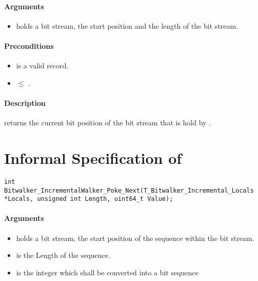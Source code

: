 \paragraph{Arguments}

\begin{itemize}
    \item  {} holds a bit stream, the start position and the length of the bit stream.
\end{itemize}

\paragraph{Preconditions}
\begin{itemize}
    \item  {} is a valid record.
    \item {} $\leq $ .
\end{itemize}

\paragraph{Description}

\peekfinish  returns the current bit position of the bit stream that is hold by .


\clearpage

\section{Informal Specification of }
\begin{lstlisting}[style=acsl-block]
int		 Bitwalker_IncrementalWalker_Poke_Next(T_Bitwalker_Incremental_Locals *Locals, unsigned int Length, uint64_t Value);
\end{lstlisting}

\paragraph{Arguments}

\begin{itemize}
    \item  {} holds a bit stream, the start position of the sequence within the bit stream.
   \item {} is the Length of the sequence.
   \item {} is the integer which shall be converted into a bit sequence
\end{itemize}

